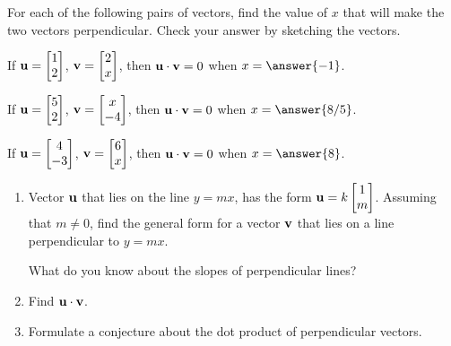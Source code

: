 \documentclass{ximera}
\renewcommand{\vec}[1]{{\bf #1}}
\newcommand{\dotp}{\cdot}
\begin{document}
\begin{problem}
  For each of the following pairs of vectors, find the value of $x$ that will make the two vectors perpendicular. Check your answer by sketching the vectors.
 
  \begin{problem}
    If $\vec{u} = \begin{bmatrix}1\\2\end{bmatrix}$, $\vec{v}=\begin{bmatrix}2\\x\end{bmatrix}$, then $\vec{u} \dotp \vec{v} = 0$ when $x = \answer{-1}$.
  \end{problem}

  \begin{problem}
    If $\vec{u} = \begin{bmatrix}5\\2\end{bmatrix}$, $\vec{v}=\begin{bmatrix}x\\-4\end{bmatrix}$, then $\vec{u} \dotp \vec{v} = 0$ when $x = \answer{8/5}$.
  \end{problem}

  \begin{problem}
    If $\vec{u} = \begin{bmatrix} 4\\-3\end{bmatrix}$, $\vec{v} =\begin{bmatrix}6\\x\end{bmatrix}$, then $\vec{u} \dotp \vec{v} = 0$ when $x = \answer{8}$.
  \end{problem}
\end{problem}

\begin{problem}
  \begin{enumerate}
    \item Vector $\vec{u}$ that lies on the line $y=mx$, has the form $\vec{u}=k\begin{bmatrix}1\\m\end{bmatrix}$.  Assuming that $m\neq 0$, find the general form for a vector $\vec{v}$ that lies on a line perpendicular to $y=mx$.
      \begin{hint}
        What do you know about the slopes of perpendicular
        lines?
      \end{hint}
    \item Find $\vec{u}\dotp \vec{v}$.
    \item Formulate a conjecture about the dot product of perpendicular vectors.
  \end{enumerate}
\end{problem}
\end{document}
